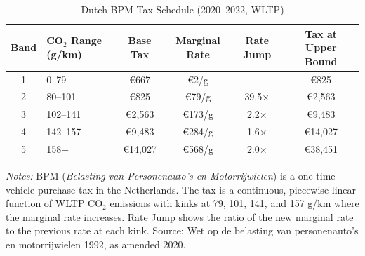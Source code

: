 \begin{table}[t]
\centering
\caption{Dutch BPM Tax Schedule (2020--2022, WLTP)}
\label{tab:bpm_schedule}
\small
\begin{threeparttable}
\begin{tabular}{clcccc}
\toprule
Band & CO$_2$ Range (g/km) & Base Tax & Marginal Rate & Rate Jump & Tax at Upper Bound \\
\midrule
1 & 0--79 & \euro 667 & \euro 2/g & --- & \euro 825 \\
2 & 80--101 & \euro 825 & \euro 79/g & 39.5$\times$ & \euro 2,563 \\
3 & 102--141 & \euro 2,563 & \euro 173/g & 2.2$\times$ & \euro 9,483 \\
4 & 142--157 & \euro 9,483 & \euro 284/g & 1.6$\times$ & \euro 14,027 \\
5 & 158+ & \euro 14,027 & \euro 568/g & 2.0$\times$ & \euro 38,451 \\
\bottomrule
\end{tabular}
\begin{tablenotes}\small
\item \textit{Notes:} BPM (\textit{Belasting van Personenauto's en Motorrijwielen}) is a one-time vehicle purchase tax in the Netherlands. The tax is a continuous, piecewise-linear function of WLTP CO$_2$ emissions with kinks at 79, 101, 141, and 157 g/km where the marginal rate increases. Rate Jump shows the ratio of the new marginal rate to the previous rate at each kink. Source: Wet op de belasting van personenauto's en motorrijwielen 1992, as amended 2020.
\end{tablenotes}
\end{threeparttable}
\end{table}
